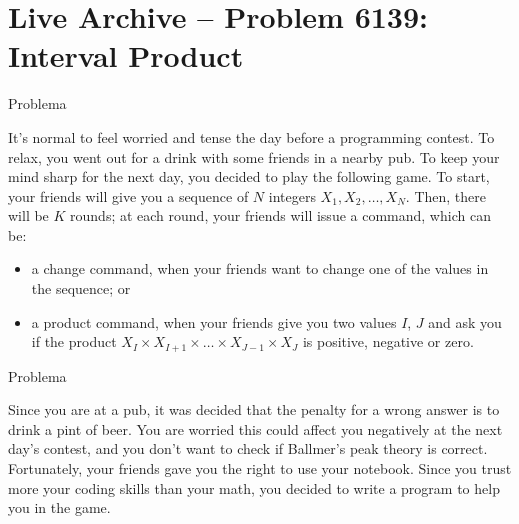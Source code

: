 \section{Live Archive -- Problem 6139: Interval Product}

\begin{frame}[fragile]{Problema}

It’s normal to feel worried and tense the day before a programming contest. To relax, you went out 
for a drink with some friends in a nearby pub. To keep your mind sharp for the next day, you 
decided to play the following game. To start, your friends will give you a sequence of $N$ 
integers $X_1, X_2, \ldots, X_N$.  Then, there will be $K$ rounds; at each round, your friends 
will issue a command, which can be:

\begin{itemize}
    \item a change command, when your friends want to change one of the values in the sequence; or
    \item a product command, when your friends give you two values $I$, $J$ and ask you if the 
        product $X_I \times X_{I+1} \times \ldots \times X_{J-1} \times X_J$ is positive, negative 
        or zero.
\end{itemize}

\end{frame}


\begin{frame}[fragile]{Problema}

Since you are at a pub, it was decided that the penalty for a wrong answer is to drink a pint 
of beer. You are worried this could affect you negatively at the next day’s contest, and you don’t
want to check if Ballmer’s peak theory is correct. Fortunately, your friends gave you the right to
use your notebook. Since you trust more your coding skills than your math, you decided to write a 
program to help you in the game.

\end{frame}

